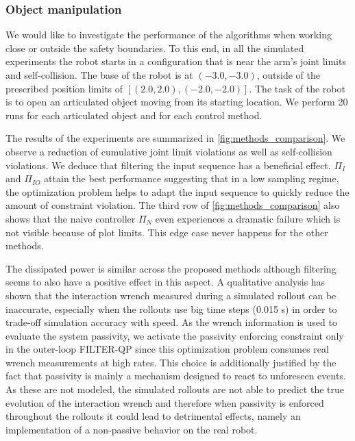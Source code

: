 \vspace{0.3cm}
\subsubsection{Object manipulation}
We would like to investigate the performance of the algorithms when working close or outside the safety boundaries. To this end, in all the simulated experiments the robot starts in a configuration that is near the arm's joint limits and self-collision. The base of the robot is at $(-3.0, -3.0)$, outside of the prescribed position limits of $[(2.0, 2.0), (-2.0, -2.0)]$. The task of the robot is to open an articulated object moving from its starting location. We perform 20 runs for each articulated object and for each control method.

The results of the experiments are summarized in \fig \ref{fig:methods_comparison}. We observe a reduction of cumulative joint limit violations as well as self-collision violations. We deduce that filtering the input sequence has a beneficial effect. $\Pi_{I}$ and $\Pi_{IO}$ attain the best performance suggesting that in a low sampling regime, the optimization problem helps to adapt the input sequence to quickly reduce the amount of constraint violation. The third row of \fig \ref{fig:methods_comparison} also shows that the naive controller $\Pi_{N}$ even experiences a dramatic failure which is not visible because of plot limits. This edge case never happens for the other methods. 

The dissipated power is similar across the proposed methods although filtering seems to also have a positive effect in this aspect. A qualitative analysis has shown that the interaction wrench measured during a simulated rollout can be inaccurate, especially when the rollouts use big time steps (0.015 s) in order to trade-off simulation accuracy with speed. As the wrench information is used to evaluate the system passivity, we activate the passivity enforcing constraint only in the outer-loop FILTER-QP since this optimization problem consumes real wrench measurements at high rates. This choice is additionally justified by the fact that passivity is mainly a mechanism designed to react to unforeseen events. As these are not modeled, the simulated rollouts are not able to predict the true evolution of the interaction wrench and therefore when passivity is enforced throughout the rollouts it could lead to detrimental effects, namely an implementation of a non-passive behavior on the real robot.


